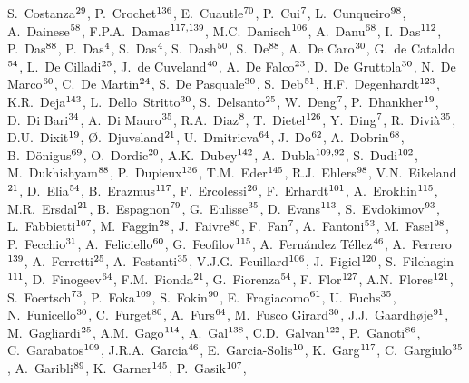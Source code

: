 \begin{flushleft}
S.~Costanza$^{\rm 29}$, 
P.~Crochet$^{\rm 136}$, 
E.~Cuautle$^{\rm 70}$, 
P.~Cui$^{\rm 7}$, 
L.~Cunqueiro$^{\rm 98}$, 
A.~Dainese$^{\rm 58}$, 
F.P.A.~Damas$^{\rm 117,139}$, 
M.C.~Danisch$^{\rm 106}$, 
A.~Danu$^{\rm 68}$, 
I.~Das$^{\rm 112}$, 
P.~Das$^{\rm 88}$, 
P.~Das$^{\rm 4}$, 
S.~Das$^{\rm 4}$, 
S.~Dash$^{\rm 50}$, 
S.~De$^{\rm 88}$, 
A.~De Caro$^{\rm 30}$, 
G.~de Cataldo$^{\rm 54}$, 
L.~De Cilladi$^{\rm 25}$, 
J.~de Cuveland$^{\rm 40}$, 
A.~De Falco$^{\rm 23}$, 
D.~De Gruttola$^{\rm 30}$, 
N.~De Marco$^{\rm 60}$, 
C.~De Martin$^{\rm 24}$, 
S.~De Pasquale$^{\rm 30}$, 
S.~Deb$^{\rm 51}$, 
H.F.~Degenhardt$^{\rm 123}$, 
K.R.~Deja$^{\rm 143}$, 
L.~Dello~Stritto$^{\rm 30}$, 
S.~Delsanto$^{\rm 25}$, 
W.~Deng$^{\rm 7}$, 
P.~Dhankher$^{\rm 19}$, 
D.~Di Bari$^{\rm 34}$, 
A.~Di Mauro$^{\rm 35}$, 
R.A.~Diaz$^{\rm 8}$, 
T.~Dietel$^{\rm 126}$, 
Y.~Ding$^{\rm 7}$, 
R.~Divi\`{a}$^{\rm 35}$, 
D.U.~Dixit$^{\rm 19}$, 
{\O}.~Djuvsland$^{\rm 21}$, 
U.~Dmitrieva$^{\rm 64}$, 
J.~Do$^{\rm 62}$, 
A.~Dobrin$^{\rm 68}$, 
B.~D\"{o}nigus$^{\rm 69}$, 
O.~Dordic$^{\rm 20}$, 
A.K.~Dubey$^{\rm 142}$, 
A.~Dubla$^{\rm 109,92}$, 
S.~Dudi$^{\rm 102}$, 
M.~Dukhishyam$^{\rm 88}$, 
P.~Dupieux$^{\rm 136}$, 
T.M.~Eder$^{\rm 145}$, 
R.J.~Ehlers$^{\rm 98}$, 
V.N.~Eikeland$^{\rm 21}$, 
D.~Elia$^{\rm 54}$, 
B.~Erazmus$^{\rm 117}$, 
F.~Ercolessi$^{\rm 26}$, 
F.~Erhardt$^{\rm 101}$, 
A.~Erokhin$^{\rm 115}$, 
M.R.~Ersdal$^{\rm 21}$, 
B.~Espagnon$^{\rm 79}$, 
G.~Eulisse$^{\rm 35}$, 
D.~Evans$^{\rm 113}$, 
S.~Evdokimov$^{\rm 93}$, 
L.~Fabbietti$^{\rm 107}$, 
M.~Faggin$^{\rm 28}$, 
J.~Faivre$^{\rm 80}$, 
F.~Fan$^{\rm 7}$, 
A.~Fantoni$^{\rm 53}$, 
M.~Fasel$^{\rm 98}$, 
P.~Fecchio$^{\rm 31}$, 
A.~Feliciello$^{\rm 60}$, 
G.~Feofilov$^{\rm 115}$, 
A.~Fern\'{a}ndez T\'{e}llez$^{\rm 46}$, 
A.~Ferrero$^{\rm 139}$, 
A.~Ferretti$^{\rm 25}$, 
A.~Festanti$^{\rm 35}$, 
V.J.G.~Feuillard$^{\rm 106}$, 
J.~Figiel$^{\rm 120}$, 
S.~Filchagin$^{\rm 111}$, 
D.~Finogeev$^{\rm 64}$, 
F.M.~Fionda$^{\rm 21}$, 
G.~Fiorenza$^{\rm 54}$, 
F.~Flor$^{\rm 127}$, 
A.N.~Flores$^{\rm 121}$, 
S.~Foertsch$^{\rm 73}$, 
P.~Foka$^{\rm 109}$, 
S.~Fokin$^{\rm 90}$, 
E.~Fragiacomo$^{\rm 61}$, 
U.~Fuchs$^{\rm 35}$, 
N.~Funicello$^{\rm 30}$, 
C.~Furget$^{\rm 80}$, 
A.~Furs$^{\rm 64}$, 
M.~Fusco Girard$^{\rm 30}$, 
J.J.~Gaardh{\o}je$^{\rm 91}$, 
M.~Gagliardi$^{\rm 25}$, 
A.M.~Gago$^{\rm 114}$, 
A.~Gal$^{\rm 138}$, 
C.D.~Galvan$^{\rm 122}$, 
P.~Ganoti$^{\rm 86}$, 
C.~Garabatos$^{\rm 109}$, 
J.R.A.~Garcia$^{\rm 46}$, 
E.~Garcia-Solis$^{\rm 10}$, 
K.~Garg$^{\rm 117}$, 
C.~Gargiulo$^{\rm 35}$, 
A.~Garibli$^{\rm 89}$, 
K.~Garner$^{\rm 145}$, 
P.~Gasik$^{\rm 107}$, 

\end{flushleft}
